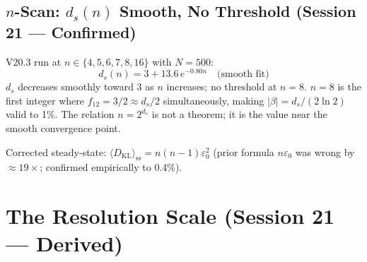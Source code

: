 \documentclass[12pt, a4paper]{article}
\begin{document}
\subsection{$n$-Scan: $d_s(n)$ Smooth, No Threshold (Session 21 --- Confirmed)}

\begin{derivedbox}[title={$d_s(n) = 3 + 13.6\,e^{-0.80n}$ (smooth) --- V20.3 $n$-scan}]
V20.3 run at $n \in \{4, 5, 6, 7, 8, 16\}$ with $N = 500$:
\[
  d_s(n) = 3 + 13.6\,e^{-0.80n} \quad \text{(smooth fit)}
\]
$d_s$ decreases smoothly toward 3 as $n$ increases; no threshold at $n = 8$.
$n = 8$ is the first integer where $f_{12} = 3/2 \approx d_s/2$ simultaneously, making
$|\beta| = d_s/(2\ln 2)$ valid to 1\%. The relation $n = 2^{d_s}$ is not a theorem;
it is the value near the smooth convergence point.

Corrected steady-state: $\langle D_{\mathrm{KL}}\rangle_{\mathrm{ss}} = n(n-1)\varepsilon_0^2$
(prior formula $n\varepsilon_0$ was wrong by $\approx 19\times$; confirmed empirically to 0.4\%).
\end{derivedbox}

\section{The Resolution Scale (Session 21 --- Derived)}
\end{document}
